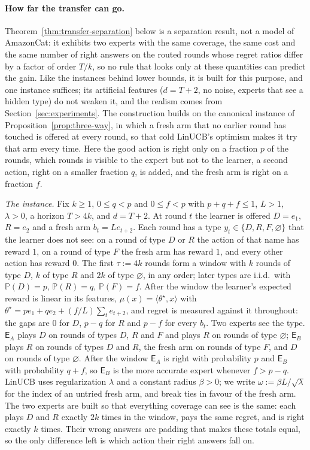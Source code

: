 \documentclass[anon]{alt2027} %
\newcommand{\Prb}{\mathbb{P}}
\newcommand{\Exp}{\mathsf{E}}
\begin{document}
\paragraph{How far the transfer can go.}
Theorem~\ref{thm:transfer-separation} below is a separation result, not a
model of AmazonCat: it exhibits two experts with the same coverage, the same
cost and the same number of right answers on the routed rounds whose regret
ratios differ by a factor of order $T/k$, so no rule that looks only at these
quantities can predict the gain. Like the instances behind lower bounds, it
is built for this purpose, and one instance suffices; its artificial features
($d=T+2$, no noise, experts that see a hidden type) do not weaken it, and the
realism comes from Section~\ref{sec:experiments}.
The construction builds on the canonical instance of
Proposition~\ref{prop:three-way}, in which a fresh arm that no earlier round
has touched is offered at every round, so that cold LinUCB's optimism makes
it try that arm every time. Here the good action is right only on a fraction
$p$ of the rounds, which rounds is visible to the expert but not to the
learner, a second action, right on a smaller fraction $q$, is added, and the
fresh arm is right on a fraction $f$.

\emph{The instance.} Fix $k\ge1$, $0\le q<p$ and $0\le f<p$ with $p+q+f\le1$,
$L>1$, $\lambda>0$, a horizon $T>4k$, and $d=T+2$. At round $t$ the learner is
offered $D=e_1$, $R=e_2$ and a fresh arm $b_t=Le_{t+2}$. Each round has a type
$y_t\in\{D,R,F,\varnothing\}$ that the learner does not see: on a round of
type $D$ or $R$ the action of that name has reward $1$, on a round of type $F$
the fresh arm has reward $1$, and every other action has reward $0$. The
first $\tau:=4k$ rounds form a window with $k$ rounds of type $D$, $k$ of type
$R$ and $2k$ of type $\varnothing$, in any order; later types are i.i.d.\ with
$\Prb(D)=p$, $\Prb(R)=q$, $\Prb(F)=f$. After the window the learner's expected
reward is linear in its features, $\mu(x)=\langle\theta^\star,x\rangle$ with
$\theta^\star=pe_1+qe_2+(f/L)\sum_{t}e_{t+2}$, and regret is measured against
it throughout: the gaps are $0$ for $D$, $p-q$ for $R$ and $p-f$ for every
$b_t$. Two experts see the type. $\Exp_A$ plays $D$ on rounds of types $D$,
$R$ and $F$ and plays $R$ on rounds of type $\varnothing$; $\Exp_B$ plays $R$
on rounds of types $D$ and $R$, the fresh arm on rounds of type $F$, and $D$
on rounds of type $\varnothing$. After the window $\Exp_A$ is right with
probability $p$ and $\Exp_B$ with probability $q+f$, so $\Exp_B$ is the more
accurate expert whenever $f>p-q$. LinUCB uses regularization $\lambda$ and a
constant radius $\beta>0$; we write $\omega:=\beta L/\sqrt\lambda$ for the
index of an untried fresh arm, and break ties in favour of the fresh arm.
The two experts are built so that everything coverage can see is the same:
each plays $D$ and $R$ exactly $2k$ times in the window, pays the same
regret, and is right exactly $k$ times. Their wrong answers are padding that
makes these totals equal, so the only difference left is which action their
right answers fall on.
\end{document}
